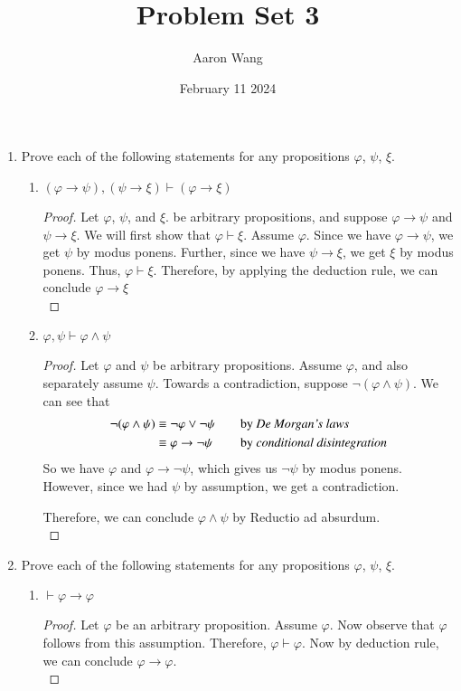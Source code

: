 \documentclass{article}
\title{Problem Set 3}
\author{Aaron Wang}
\date{February 11 2024}
\newcommand{\lif}{\mathrel{\rightarrow}}
\newcommand{\proves}{\mathrel{\vdash}}
\begin{document}
\maketitle
\begin{enumerate}
    \item Prove each of the following statements for any propositions $\varphi$, $\psi$, $\xi$.
    \begin{enumerate}
        \item $(\varphi \lif \psi), (\psi \lif \xi) \proves (\varphi \lif \xi)$
        \begin{proof}
        Let $\varphi$, $\psi$, and $\xi$. be arbitrary propositions, and suppose $\varphi \lif \psi$ and $\psi \lif \xi$. We will first show that $\varphi \proves \xi$. Assume $\varphi$. Since we have $\varphi\lif\psi$, we get $\psi$ by modus ponens. Further, since we have $\psi \lif \xi$, we get $\xi$ by modus ponens. Thus, $\varphi \proves \xi$. Therefore, by applying the deduction rule, we can conclude $\varphi \lif \xi$
        \\
        \end{proof}
        \item $\varphi, \psi \proves \varphi \land \psi$
        \begin{proof}
        Let $\varphi$ and $\psi$ be arbitrary propositions. Assume $\varphi$, and also separately assume $\psi$. Towards a contradiction, suppose $\neg ( \varphi \land \psi)$. We can see that
        \begin{align*}
          \neg (\varphi \land \psi)
            &\equiv \neg\varphi\lor\neg\psi
              &\quad
              &\text{by \emph{De Morgan's laws}}
              \\
            &\equiv \varphi\lif\neg\psi
              &\quad
              &\text{by \emph{conditional disintegration}}
              \\
        \end{align*}
        So we have $\varphi$ and $\varphi\lif\neg\psi$, which gives us $\neg\psi$ by modus ponens. However, since we had $\psi$ by assumption, we get a contradiction.
        
        Therefore, we can conclude $\varphi \land \psi$ by Reductio ad absurdum. 
        \\
        \end{proof}
    \end{enumerate}
\pagebreak
    \item Prove each of the following statements for any propositions $\varphi$, $\psi$, $\xi$.
    \begin{enumerate}
        \item $\proves \varphi \lif \varphi$
        \begin{proof}
        Let $\varphi$ be an arbitrary proposition. Assume $\varphi$. Now observe that $\varphi$ follows from this assumption. Therefore, $\varphi\proves\varphi$. Now by deduction rule, we can conclude $\varphi\lif\varphi$.
        \\
        \end{proof}


\end{enumerate}
\end{enumerate}
\end{document}
